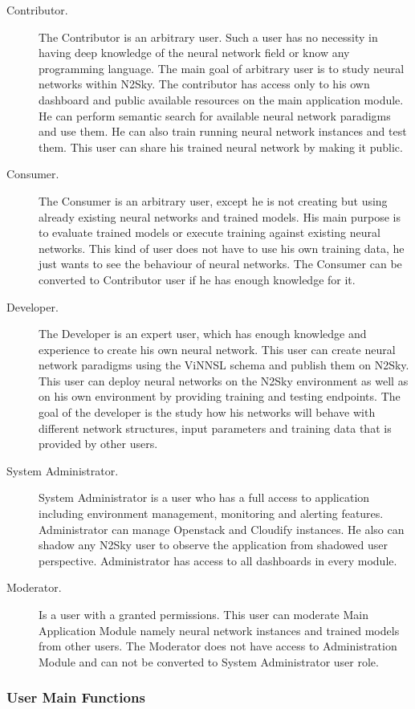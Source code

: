 \begin{description}
\item[Contributor.]   The Contributor is an arbitrary user. Such a user has no necessity in having deep knowledge of the neural network field or know any programming language. The main goal of arbitrary user is to study neural networks within N2Sky. The contributor has access only to his own dashboard and public available resources on the main application module. He can perform semantic search for available neural network paradigms and use them. He can also train running neural network instances and test them. This user can share his trained neural network by making it public. 
\item[Consumer.] The Consumer is an arbitrary user, except he is not creating but using already existing neural networks and trained models. His main purpose is to evaluate trained models or execute training against existing neural networks. This kind of user does not have to use his own training data, he just wants to see the behaviour of neural networks. The Consumer can be converted to Contributor user if he has enough knowledge for it. 
\item[Developer.] The Developer is an expert user, which has enough knowledge and experience to create his own neural network. This user can create neural network paradigms using the ViNNSL schema and publish them on N2Sky. This user can deploy neural networks on the N2Sky environment as well as on his own environment by providing training and testing endpoints. The goal of the developer is the study how his networks will behave with different network structures, input parameters and training data that is provided by other users.
\item[System Administrator.] System Administrator is a user who has a full access to application including environment management, monitoring and alerting features. Administrator can manage Openstack and Cloudify instances. He also can shadow any N2Sky user to observe the application from shadowed user perspective. Administrator has access to all dashboards in every module.
\item[Moderator.] Is a user with a granted permissions. This user can moderate Main Application Module namely neural network instances and  trained models from other users. The Moderator does not have access to Administration Module and can not be converted to System Administrator user role.
\end{description}

\subsubsection{User Main Functions}\label{User Permissions}

